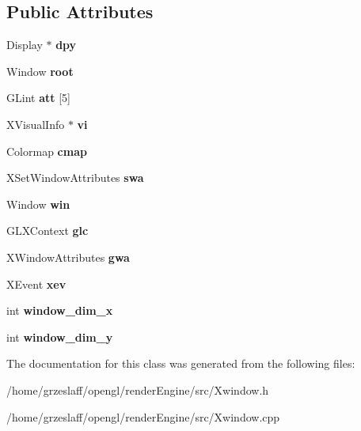\subsection*{Public Attributes}
\begin{DoxyCompactItemize}
\item 
\hypertarget{classXwindow_adf49a4e48ae7a3becc2323cecddb92f4}{Display $\ast$ {\bfseries dpy}}\label{classXwindow_adf49a4e48ae7a3becc2323cecddb92f4}

\item 
\hypertarget{classXwindow_a683e71b5c1913ac33ecb510672948f3f}{Window {\bfseries root}}\label{classXwindow_a683e71b5c1913ac33ecb510672948f3f}

\item 
\hypertarget{classXwindow_a357f417513e5db5943a216b699e05669}{G\-Lint {\bfseries att} \mbox{[}5\mbox{]}}\label{classXwindow_a357f417513e5db5943a216b699e05669}

\item 
\hypertarget{classXwindow_a108b0cefc5979501d28e00df5bdba046}{X\-Visual\-Info $\ast$ {\bfseries vi}}\label{classXwindow_a108b0cefc5979501d28e00df5bdba046}

\item 
\hypertarget{classXwindow_aa9fb92699418081b08114401c18a4017}{Colormap {\bfseries cmap}}\label{classXwindow_aa9fb92699418081b08114401c18a4017}

\item 
\hypertarget{classXwindow_acab1e0896e66490adc87142f4d0bdaea}{X\-Set\-Window\-Attributes {\bfseries swa}}\label{classXwindow_acab1e0896e66490adc87142f4d0bdaea}

\item 
\hypertarget{classXwindow_a123f213af79882fb44f757b0fa225e40}{Window {\bfseries win}}\label{classXwindow_a123f213af79882fb44f757b0fa225e40}

\item 
\hypertarget{classXwindow_a0619b8a3c66eab7bc3a0bd1616448f25}{G\-L\-X\-Context {\bfseries glc}}\label{classXwindow_a0619b8a3c66eab7bc3a0bd1616448f25}

\item 
\hypertarget{classXwindow_a528690ce6d32e2c7063b539f5b4f9dd6}{X\-Window\-Attributes {\bfseries gwa}}\label{classXwindow_a528690ce6d32e2c7063b539f5b4f9dd6}

\item 
\hypertarget{classXwindow_affcabe1d03b67cb60bb8c60e05ab1972}{X\-Event {\bfseries xev}}\label{classXwindow_affcabe1d03b67cb60bb8c60e05ab1972}

\item 
\hypertarget{classXwindow_a41b3fcd90ffa8879abac789b72dbd3d5}{int {\bfseries window\-\_\-dim\-\_\-x}}\label{classXwindow_a41b3fcd90ffa8879abac789b72dbd3d5}

\item 
\hypertarget{classXwindow_a701ec0c1c2c7b0c0137f94553644ee10}{int {\bfseries window\-\_\-dim\-\_\-y}}\label{classXwindow_a701ec0c1c2c7b0c0137f94553644ee10}

\end{DoxyCompactItemize}


The documentation for this class was generated from the following files\-:\begin{DoxyCompactItemize}
\item 
/home/grzeslaff/opengl/render\-Engine/src/Xwindow.\-h\item 
/home/grzeslaff/opengl/render\-Engine/src/Xwindow.\-cpp\end{DoxyCompactItemize}
